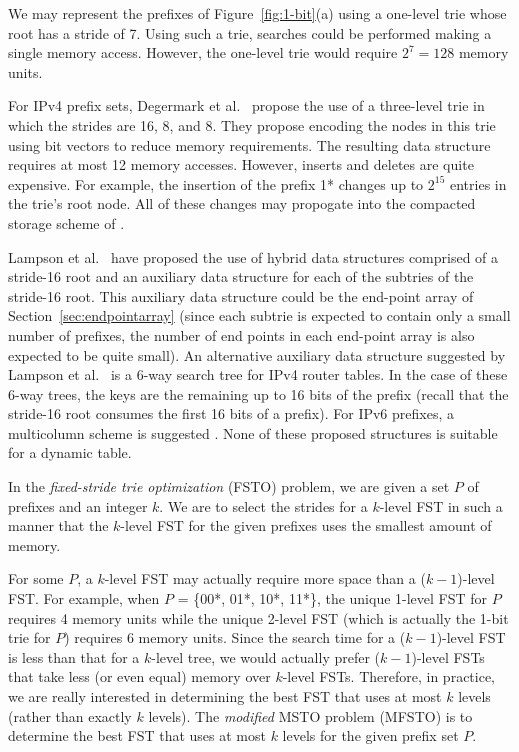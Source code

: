 We may represent the prefixes of Figure~\ref{fig:1-bit}(a) using a one-level
trie whose root has a stride of 7. Using such a trie, searches could be
performed making a single memory access. However, the one-level trie would
require $2^7 = 128$ memory units.

For IPv4 prefix sets,
Degermark et al.~\cite{deger} propose the use of a three-level trie in which the
strides are 16, 8, and 8. They propose encoding the nodes in this trie using
bit vectors to reduce memory requirements. The resulting data structure
requires at most 12 memory accesses. However, inserts and deletes are quite
expensive. For example, the insertion of the prefix 1* changes up to
$2^{15}$ entries
in the trie's root node. All of these changes may propogate into the
compacted storage scheme of \cite{deger}.

Lampson et al.~\cite{lamp} have proposed the use of hybrid data structures
comprised of a stride-16 root and an auxiliary data structure for
each of the subtries of
the stride-16 root. This auxiliary data structure could be
the end-point array of Section~\ref{sec:endpointarray} (since each subtrie
is expected to contain only a small number of prefixes, the number of
end points in each end-point array is also expected to be quite small).
An alternative auxiliary data structure suggested by Lampson et al.~\cite{lamp}
is a 6-way search tree for IPv4 router tables. In the case of these
6-way trees, the keys are the remaining up to 16 bits of the prefix (recall that
the stride-16 root consumes the first 16 bits of a prefix). For IPv6 prefixes,
a multicolumn scheme is suggested \cite{lamp}. None of these proposed
structures is suitable for a dynamic table.

In the {\em fixed-stride trie optimization} (FSTO) problem, we are given
a set $P$ of prefixes and an integer $k$. We are to select the strides for
a $k$-level FST in such a manner that the $k$-level FST for the
given prefixes uses the smallest amount of memory.

For some $P$, a $k$-level FST may actually require more space than 
a ($k-1$)-level FST. For example, when $P$ = \{00*, 01*, 10*, 11*\},
the unique 1-level FST for $P$ requires 4 memory units while
the unique 2-level FST (which is actually the 1-bit trie for $P$)
requires 6 memory units.  Since the search time for a ($k-1$)-level FST
is less than that for a $k$-level tree, we would actually prefer
($k-1$)-level FSTs that take less (or even equal) memory over
$k$-level FSTs. Therefore, in practice, we are really interested
in determining the best FST that uses at most $k$ levels (rather than
exactly $k$ levels). The {\em modified} MSTO problem (MFSTO) is to determine
the best FST that uses at most $k$ levels for the given prefix set $P$.


